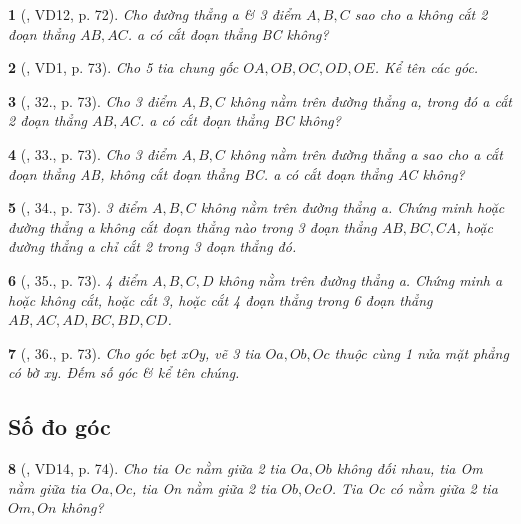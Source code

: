 \documentclass{article}
\newtheorem{baitoan}{}
\begin{document}
\begin{baitoan}[\cite{Binh_Toan_6_tap_2}, VD12, p. 72]
	Cho đường thẳng a \& 3 điểm $A,B,C$ sao cho a không cắt 2 đoạn thẳng $AB,AC$. a có cắt đoạn thẳng BC không?
\end{baitoan}

\begin{baitoan}[\cite{Binh_Toan_6_tap_2}, VD1, p. 73]
	Cho 5 tia chung gốc $OA,OB,OC,OD,OE$. Kể tên các góc.
\end{baitoan}

\begin{baitoan}[\cite{Binh_Toan_6_tap_2}, 32., p. 73]
	Cho 3 điểm $A,B,C$ không nằm trên đường thẳng a, trong đó a cắt 2 đoạn thẳng $AB,AC$. a có cắt đoạn thẳng BC không?
\end{baitoan}

\begin{baitoan}[\cite{Binh_Toan_6_tap_2}, 33., p. 73]
	Cho 3 điểm $A,B,C$ không nằm trên đường thẳng a sao cho a cắt đoạn thẳng AB, không cắt đoạn thẳng BC. a có cắt đoạn thẳng AC không?
\end{baitoan}

\begin{baitoan}[\cite{Binh_Toan_6_tap_2}, 34., p. 73]
	3 điểm $A,B,C$ không nằm trên đường thẳng a. Chứng minh hoặc đường thẳng a không cắt đoạn thẳng nào trong 3 đoạn thẳng $AB,BC,CA$, hoặc đường thẳng a chỉ cắt 2 trong 3 đoạn thẳng đó.
\end{baitoan}

\begin{baitoan}[\cite{Binh_Toan_6_tap_2}, 35., p. 73]
	4 điểm $A,B,C,D$ không nằm trên đường thẳng a. Chứng minh a hoặc không cắt, hoặc cắt 3, hoặc cắt 4 đoạn thẳng trong 6 đoạn thẳng $AB,AC,AD,BC,BD,CD$.
\end{baitoan}

\begin{baitoan}[\cite{Binh_Toan_6_tap_2}, 36., p. 73]
	Cho góc bẹt xOy, vẽ 3 tia $Oa,Ob,Oc$ thuộc cùng 1 nửa mặt phẳng có bờ xy. Đếm số góc \& kể tên chúng.
\end{baitoan}


\subsection{Số đo góc}

\begin{baitoan}[\cite{Binh_Toan_6_tap_2}, VD14, p. 74]
	Cho tia Oc nằm giữa 2 tia $Oa,Ob$ không đối nhau, tia Om nằm giữa tia $Oa,Oc$, tia On nằm giữa 2 tia $Ob,Oc$O. Tia Oc có nằm giữa 2 tia $Om,On$ không?
\end{baitoan}
\end{document}
